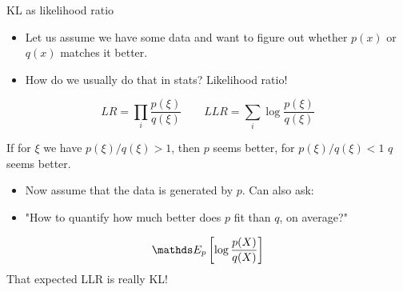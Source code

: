 \documentclass[11pt,compress,t,notes=noshow, xcolor=table]{beamer}
\begin{document}
\begin{vbframe}{KL as likelihood ratio}

\begin{itemize}
\item Let us assume we have some data and want to figure out whether $p(x)$ or $q(x)$ matches it better.
\item How do we usually do that in stats? Likelihood ratio! 
\end{itemize}

$$ LR = \prod_i \frac{p(\xi)}{q(\xi)} \qquad LLR = \sum_i \log \frac{p(\xi)}{q(\xi)} $$
  
If for $\xi$ we have $p(\xi)/q(\xi)>1$, then $p$ seems better, for $p(\xi)/q(\xi) < 1$ $q$ seems better. \\
\begin{itemize}
    \item Now assume that the data is generated by $p$. Can also ask:
    \item "How to quantify how much better does $p$ fit than $q$, on average?"
\end{itemize}
$$ \E_p \left[\log \frac{p(X)}{q(X)}\right] $$
That expected LLR is really KL!

\end{vbframe}



  



\end{document}
